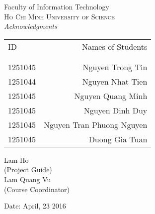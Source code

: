 \newpage
\thispagestyle{empty}

\begin{center}

\huge{Faculty of Information Technology}\\[0.5cm]
\normalsize
\textsc{Ho Chi Minh University of Science}\\[2.0cm]

\emph{\LARGE Acknowledgments}\\[2.5cm]
\end{center}

\begin{table}[h]
\centering
\begin{tabular}{lr}
ID & Names of Students \\ \\ \hline
\\
1251045 & Nguyen Trong Tin \\ 
1251044 & Nguyen Nhat Tien \\
1251045 & Nguyen Quang Minh \\
1251045 & Nguyen Dinh Duy \\
1251045 & Nguyen Tran Phuong Nguyen \\
1251045 & Duong Gia Tuan \\
\end{tabular}
\end{table}

\vfill


\begin{flushright}
Lam Ho\\
(Project Guide)\\[1.5cm]
Lam Quang Vu\\
(Course Coordinator)\\
\end{flushright}

\begin{flushleft}
Date: April, 23 2016
\end{flushleft}
